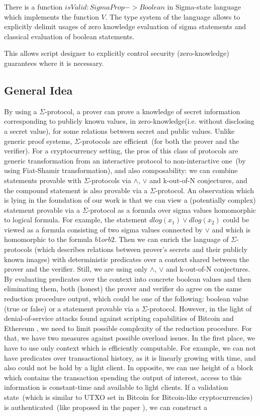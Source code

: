 \documentclass[11pt]{article}
\newcommand{\authnote}[2]{\marginpar{\parbox{\marginparwidth}{\tiny %
  \textsf{#1 {\textcolor{blue}{notes: #2}}}}}%
  \textcolor{blue}{\textbf{\dag}}}
\newcommand{\authnote}[2]{
  \textsf{#1 \textcolor{blue}{: #2}}}
\newcommand{\authnote}[2]{}
\newcommand{\knote}[1]{{\authnote{\textcolor{green}{kushti notes}}{#1}}}
\begin{document}
There is a function $isValid: SigmaProp -> Boolean$ in Sigma-state language which implements the function $V$.
The type system of the language allows to explicitly delimit usages of zero knowledge evaluation
of sigma statements and classical evaluation of boolean statements.

This allows script designer to explicitly control security (zero-knowledge) guarantees where it is necessary.

\subsection{General Idea}

By using a $\Sigma$-protocol, a prover can prove a knowledge of secret information corresponding to publicly known values, in zero-knowledge(i.e. without disclosing a secret value), for some relations between secret and public values. Unlike generic proof systems, $\Sigma$-protocols are efficient~(for both the prover and the verifier). For a cryptocurrency setting, the pros of this class of protocols are generic transformation from an interactive protocol to non-interactive one~(by using Fiat-Shamir transformation), and also composability: we can combine statements provable with $\Sigma$-protocols via $\land$, $\lor$ and k-out-of-N conjectures, and the compound statement is also provable via a $\Sigma$-protocol. An observation which is lying in the foundation of our work is that we can view a (potentially complex) statement provable via a $\Sigma$-protocol as a formula over sigma values homomorphic to logical formula. For example, the statement $dlog(x_1) \lor dlog(x_2)$ could be viewed as a formula consisting of two sigma values connected by $\lor$ and which is homomorphic to the formula $b1 or b2$. Then we can enrich the language of $\Sigma$-protocols (which describes relations between prover's secrets and their publicly known images) with deterministic predicates over a context shared between the prover and the verifier. Still, we are using only $\land$, $\lor$ and k-out-of-N conjectures. By evaluating predicates over the context into concrete boolean values and then eliminating them, both (honest) the prover and verifier do agree on the same reduction procedure output, which could be one of the following: boolean value (true or false) or a statement provable via a $\Sigma$-protocol. However, in the light of denial-of-service attacks found against scripting capabilities of Bitcoin and Ethereum \knote{todo: links}, we need to limit possible complexity of the reduction procedure. For that, we have two measures against possible overload issues. In the first place, we have to use only context which is efficiently computable. For example, we can not have predicates over transactional history, as it is linearly growing with time, and also could not be hold by a light client. In opposite, we can use height of a block which contains the transaction spending the output of interest, access to this information is constant-time and available to light clients. If a validation state~(which is similar to UTXO set in Bitcoin for Bitcoin-like cryptocurrencies) is authenticated~(like proposed in the paper \knote{cite AVL paper}), we can construct a 
\end{document}
